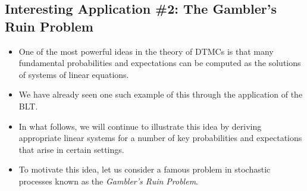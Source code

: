 \subsection{Interesting Application \#2: The Gambler's Ruin Problem}
\begin{itemize}
      \item One of the most powerful ideas in the theory of DTMCs is that many fundamental
            probabilities and expectations can be computed as the solutions of systems of linear equations.
      \item We have already seen one such example of this through the application of the BLT\@.
      \item In what follows, we will continue to illustrate this idea by deriving appropriate linear systems
            for a number of key probabilities and expectations that arise in certain settings.
      \item To motivate this idea, let us consider a famous problem in stochastic processes known as the
            \emph{Gambler's Ruin Problem}.
\end{itemize}
